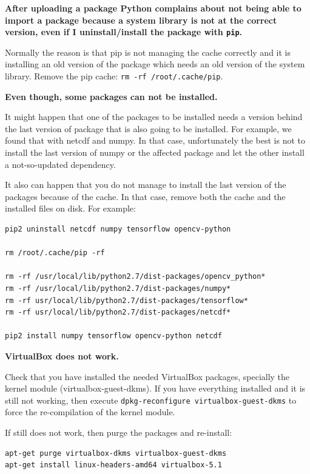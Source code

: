 \documentclass[a4paper,12pt]{article}
\begin{document}
\textbf{After uploading a package Python complains about not being able to import a package because a system library is not at the correct version, even if I uninstall/install the package with {\tt pip}.}

Normally the reason is that pip is not managing the cache correctly and it is installing an old version of the package which needs an old version of the system library. Remove the pip cache: {\tt rm -rf /root/.cache/pip}.
\vspace{0.5cm}

\textbf{Even though, some packages can not be installed.}

It might happen that one of the packages to be installed needs a version behind the last version of package that is also going to be installed. For example, we found that with netcdf and numpy. In that case, unfortunately the best is not to install the last version of numpy or the affected package and let the other install a not-so-updated dependency.

It also can happen that you do not manage to install the last version of the packages because of the cache. In that case, remove both the cache and the installed files on disk. For example:

\begin{verbatim}
pip2 uninstall netcdf numpy tensorflow opencv-python

rm /root/.cache/pip -rf

rm -rf /usr/local/lib/python2.7/dist-packages/opencv_python*
rm -rf /usr/local/lib/python2.7/dist-packages/numpy*
rm -rf usr/local/lib/python2.7/dist-packages/tensorflow*
rm -rf usr/local/lib/python2.7/dist-packages/netcdf*

pip2 install numpy tensorflow opencv-python netcdf
\end{verbatim}
\vspace{0.5cm}

\textbf{VirtualBox does not work.}

Check that you have installed the needed VirtualBox packages, specially the kernel module (virtualbox-guest-dkms).
If you have everything installed and it is still not working, then execute {\tt dpkg-reconfigure virtualbox-guest-dkms} to force the re-compilation of the kernel module.

If still does not work, then purge the packages and re-install:

\begin{verbatim}
apt-get purge virtualbox-dkms virtualbox-guest-dkms
apt-get install linux-headers-amd64 virtualbox-5.1
\end{verbatim}
\vspace{0.5cm}
\end{document}
